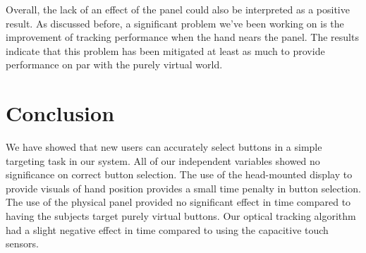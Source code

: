 Overall, the lack of an effect of the panel could also be interpreted as a positive result.
As discussed before, a significant problem we've been working on is the improvement of tracking performance when the hand nears the panel.
The results indicate that this problem has been mitigated at least as much to provide performance on par with the purely virtual world.

\section{Conclusion}


We have showed that new users can accurately select buttons in a simple targeting task in our system.
All of our independent variables showed no significance on correct button selection.
The use of the head-mounted display to provide visuals of hand position provides a small time penalty in button selection.
The use of the physical panel provided no significant effect in time compared to having the subjects target purely virtual buttons.
Our optical tracking algorithm had a slight negative effect in time compared to using the capacitive touch sensors.

